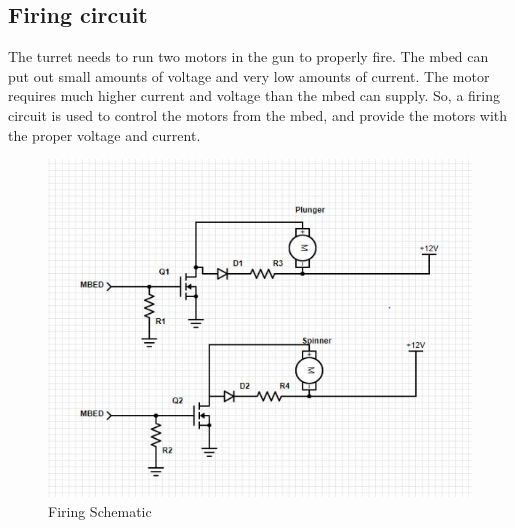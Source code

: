 ﻿\subsection{Firing circuit}
The turret needs to run two motors in the gun to properly fire. The mbed can put out small amounts of voltage and very low amounts of current. The motor requires much higher current and voltage than the mbed can supply. So, a firing circuit is used to control the  motors from the mbed, and provide the motors with the proper voltage and current.
\begin{figure}[h!]
    \centering
    \includegraphics[scale=.5]{fcscheme.JPG}
    \caption{Firing Schematic}
    \label{fig:firing schematic}
\end{figure}

